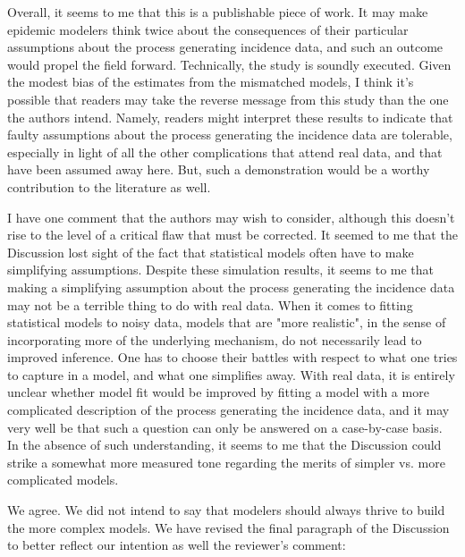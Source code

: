 \documentclass[12pt]{article}
\newcommand{\revtext}{\textsf}
\begin{document}
\revtext{Overall, it seems to me that this is a publishable piece of work.  It may make epidemic modelers think twice about the consequences of their particular assumptions about the process generating incidence data, and such an outcome would propel the field forward.  Technically, the study is soundly executed.  Given the modest bias of the estimates from the mismatched models, I think it's possible that readers may take the reverse message from this study than the one the authors intend.  Namely, readers might interpret these results to indicate that faulty assumptions about the process generating the incidence data are tolerable, especially in light of all the other complications that attend real data, and that have been assumed away here.  But, such a demonstration would be a worthy contribution to the literature as well.}

\revtext{I have one comment that the authors may wish to consider, although this doesn't rise to the level of a critical flaw that must be corrected.  It seemed to me that the Discussion lost sight of the fact that statistical models often have to make simplifying assumptions.  Despite these simulation results, it seems to me that making a simplifying assumption about the process generating the incidence data may not be a terrible thing to do with real data.  When it comes to fitting statistical models to noisy data, models that are "more realistic", in the sense of incorporating more of the underlying mechanism, do not necessarily lead to improved inference.  One has to choose their battles with respect to what one tries to capture in a model, and what one simplifies away.  With real data, it is entirely unclear whether model fit would be improved by fitting a model with a more complicated description of the process generating the incidence data, and it may very well be that such a
question can only be answered on a case-by-case basis.  In the absence of such understanding, it seems to me that the Discussion could strike a somewhat more measured tone regarding the merits of simpler vs. more complicated models.}

We agree. We did not intend to say that modelers should always thrive to build the more complex models. We have revised the final paragraph of the Discussion to better reflect our intention as well the reviewer's comment:
\end{document}
